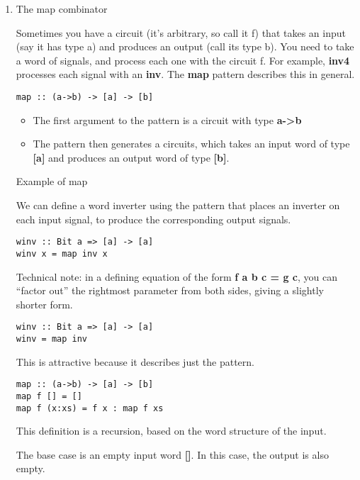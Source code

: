 \documentclass[11pt]{article}
\begin{document}
\begin{enumerate}
\item The map combinator
\label{sec:org2f63f14}

Sometimes you have a circuit (it's arbitrary, so call it f) that takes
an input (say it has type a) and produces an output (call its type
b).  You need to take a word of signals, and process each one with
the circuit f.  For example, \textbf{inv4} processes each signal with an
\textbf{inv}.  The \textbf{map} pattern describes this in general.



\begin{verbatim}
map :: (a->b) -> [a] -> [b]
\end{verbatim}


\begin{itemize}
\item The first argument to the pattern is a circuit with type  \textbf{a->b}
\item The pattern then generates a circuits, which takes an input word of
type \textbf{[a]} and produces an output word of type \textbf{[b]}.
\end{itemize}

Example of map

We can define a word inverter using the pattern that places an
inverter on each input signal, to produce the corresponding output
signals.


\begin{verbatim}
winv :: Bit a => [a] -> [a]
winv x = map inv x
\end{verbatim}


Technical note: in a defining equation of the form \textbf{f a b c
  = g c}, you can ``factor out'' the rightmost parameter from both
sides, giving a slightly shorter form.


\begin{verbatim}
winv :: Bit a => [a] -> [a]
winv = map inv
\end{verbatim}

This is attractive because it describes just the pattern.


\begin{verbatim}
map :: (a->b) -> [a] -> [b]
map f [] = []
map f (x:xs) = f x : map f xs
\end{verbatim}


This definition is a recursion, based on the word structure of the
input.

The base case is an empty input word \textbf{[]}.  In this
case, the output is also empty.


\end{enumerate}
\end{document}
